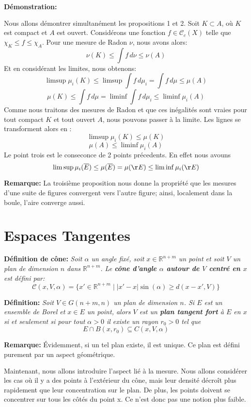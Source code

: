 \documentclass{article}
\begin{document}
\vspace{1ex}
\textbf{Démonstration:}

Nous allons démontrer simultanément les propositions 1 et 2. Soit $K \subset A$,
où $K$ est compact et $A$ est ouvert. Considérons une fonction $f\in\mathcal{C}
_c(X)$ telle que $\chi_K\leq f\leq\chi_A$. Pour une mesure de Radon $\nu$, nous
avons alors:
\[\nu(K) \leq \int f \,d\nu \leq \nu(A)\]
Et en considérant les limites, nous obtenons:
\[\limsup \mu_i(K) \leq \limsup \int f \,d\mu_i = \int f \,d\mu \leq \mu(A)\]
\[\mu(K) \leq \int f \,d\mu = \liminf \int f \,d\mu_i \leq \liminf \mu_i(A)\]
Comme nous traitons des mesures de Radon et que ces inégalités sont vraies pour
tout compact $K$ et tout ouvert $A$, nous pouvons passer à la limite. Les
lignes se transforment alors en :
\[\limsup \mu_i(K) \leq \mu(K)\]
\[\mu(A) \leq \liminf \mu_i(A)\]
Le point trois est le conseconce de 2 points précedents. En effet nous avouns
\[\limsup\mu_i(\overline E)\leq\mu(\overline E)=\mu(\r E)\leq\liminf\mu_i(\r E)\]

\vspace{2ex}
\textbf{Remarque:}  La troisième proposition nous donne la propriété que les
mesures d'une suite de figures convergent vers l'autre figure; ainsi,
localement dans la boule, l'aire converge aussi.

\section{Espaces Tangentes}
\textbf{Définition de cône:} \textit{Soit $\alpha$ un angle fixé, soit $x\in\mathbb
R^{n+m}$ un point et soit $V$ un plan de dimension $n$ dans $\mathbb R^{n+m}$.
Le \textbf{cône d'angle $\alpha$ autour de $V$ centré en $x$} est défini par:
\[\mathcal C(x,V,\alpha)=\{x'\in\mathbb R^{n+m}\;|\; |x′−x|\sin(\alpha)\geq d(x−x′, V)\}\]
}

\vspace{2ex}
\textbf{Définition:} \textit{Soit $V\in G(n+m,n)$ un plan de dimension $n$. Si
$E$ est un ensemble de Borel et $x\in E$ un point, alors $V$ est un \textbf{plan
tangent fort} à $E$ en $x$ si et seulement si pour tout $\alpha >0$ il existe un rayon $r_0
>0$ tel que
\[E∩B(x, r_0)\subseteq C(x, V, \alpha)\]}

\vspace{1ex}
\textbf{Remarque:} Évidemment, si un tel plan existe, il est unique. Ce plan
est défini purement par un aspect géométrique.

\vspace{2ex}
Maintenant, nous allons introduire l'aspect lié à la mesure. Nous allons
considérer les cas où il y a des points à l'extérieur du cône, mais leur
densité décroît plus rapidement que leur concentration sur le plan. De plus,
les points doivent se concentrer sur tous les côtés du point x. Ce n'est donc
pas une notion plus faible.
\end{document}
